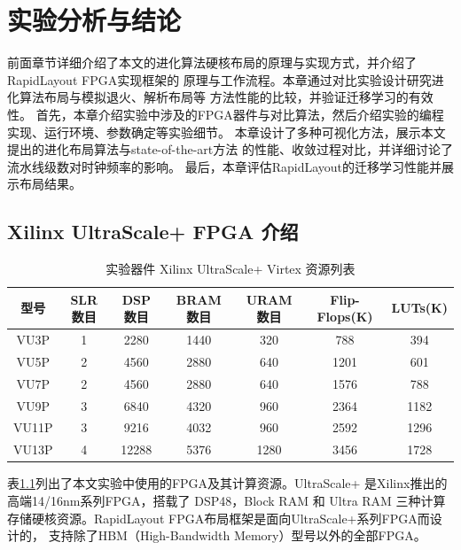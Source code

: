 \chapter{实验分析与结论}

前面章节详细介绍了本文的进化算法硬核布局的原理与实现方式，并介绍了RapidLayout FPGA实现框架的
原理与工作流程。本章通过对比实验设计研究进化算法布局与模拟退火、解析布局等
方法性能的比较，并验证迁移学习的有效性。
首先，本章介绍实验中涉及的FPGA器件与对比算法，然后介绍实验的编程实现、运行环境、参数确定等实验细节。
本章设计了多种可视化方法，展示本文提出的进化布局算法与state-of-the-art方法
的性能、收敛过程对比，并详细讨论了流水线级数对时钟频率的影响。
最后，本章评估RapidLayout的迁移学习性能并展示布局结果。

\section{Xilinx UltraScale+ FPGA 介绍}

\begin{table}[h]
	\centering
	\caption{实验器件 Xilinx UltraScale+ Virtex 资源列表}		
	\label{tab:fpg}
	\begin{tabular}{c|c c c c c c}
		\toprule[2pt]
        型号 	& SLR数目 & DSP 数目 & BRAM 数目 & URAM 数目 & Flip-Flops(K) & LUTs(K)	\\
        \midrule[2pt]
        VU3P   & 1       & 2280    & 1440     & 320       & 788               & 394 \\
        \hline 
        VU5P   & 2       & 4560    & 2880     & 640       & 1201              & 601 \\
        \hline
        VU7P   & 2       & 4560    & 2880     & 640       & 1576              & 788 \\
        \hline
        VU9P   & 3       & 6840    & 4320     & 960       & 2364              & 1182 \\
        \hline
        VU11P  & 3       & 9216    & 4032     & 960       & 2592              & 1296 \\
        \hline 
        VU13P  & 4       & 12288   & 5376     & 1280      & 3456              & 1728 \\
        \bottomrule[2pt]
	\end{tabular}
\end{table}

表\ref{tab:fpg}列出了本文实验中使用的FPGA及其计算资源。UltraScale+ 是Xilinx推出的高端14/16nm系列FPGA，搭载了
DSP48，Block RAM 和 Ultra RAM 三种计算存储硬核资源。RapidLayout FPGA布局框架是面向UltraScale+系列FPGA而设计的，
支持除了HBM（High-Bandwidth Memory）型号以外的全部FPGA。

